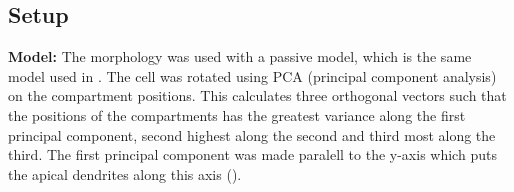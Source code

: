 \documentclass[altfont, fleqn]{uiophd}
\renewcommand{\cref}[1]{{\color{viridis_03}\mycref{#1}}}
\begin{document}
\subsection{Setup}
\textbf{Model:}
The \textcite{mainen_influence_1996} morphology was used with a passive model, which is 
the same model used in \textcite{pettersen_amplitude_2008}. 
The cell was rotated using PCA (principal component analysis) on the compartment
positions.
This calculates three orthogonal vectors such that 
the positions of the compartments 
has the greatest variance along the first principal component, 
second highest along the second and third most along the third.
The first principal component was made paralell to the y-axis which
puts the apical dendrites along this axis
(\cref{fig:4_1_morph}).
\\
\end{document}
